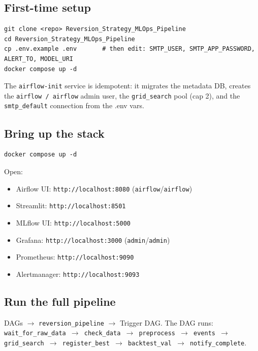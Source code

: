 \documentclass[11pt,a4paper]{article}
\begin{document}
\subsection{First-time setup}

\begin{lstlisting}[style=bashstyle]
git clone <repo> Reversion_Strategy_MLOps_Pipeline
cd Reversion_Strategy_MLOps_Pipeline
cp .env.example .env       # then edit: SMTP_USER, SMTP_APP_PASSWORD, ALERT_TO, MODEL_URI
docker compose up -d
\end{lstlisting}

The \texttt{airflow-init} service is idempotent: it migrates the metadata DB, creates the \texttt{airflow / airflow} admin user, the \texttt{grid\_search} pool (cap 2), and the \texttt{smtp\_default} connection from the .env vars.

\subsection{Bring up the stack}

\begin{lstlisting}[style=bashstyle]
docker compose up -d
\end{lstlisting}

Open:
\begin{itemize}[leftmargin=1.5em,itemsep=0pt]
  \item Airflow UI: \texttt{http://localhost:8080} (\texttt{airflow}/\texttt{airflow})
  \item Streamlit: \texttt{http://localhost:8501}
  \item MLflow UI: \texttt{http://localhost:5000}
  \item Grafana: \texttt{http://localhost:3000} (\texttt{admin}/\texttt{admin})
  \item Prometheus: \texttt{http://localhost:9090}
  \item Alertmanager: \texttt{http://localhost:9093}
\end{itemize}

\subsection{Run the full pipeline}

DAGs $\to$ \texttt{reversion\_pipeline} $\to$ Trigger DAG. The DAG runs:
\texttt{wait\_for\_raw\_data $\to$ check\_data $\to$ preprocess $\to$ events $\to$ grid\_search $\to$ register\_best $\to$ backtest\_val $\to$ notify\_complete}.
\end{document}
